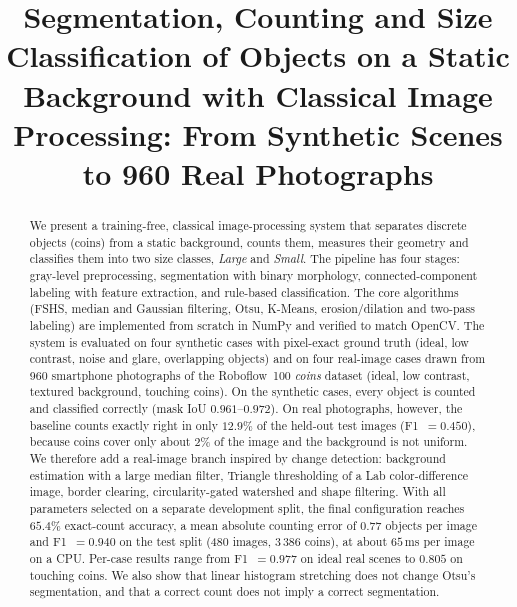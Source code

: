 \documentclass[conference,a4paper]{IEEEtran}
\newcommand{\vn}[1]{{\fontencoding{T5}\selectfont #1}}  %
\begin{document}
\title{Segmentation, Counting and Size Classification of Objects on a Static Background with Classical Image Processing: From Synthetic Scenes to 960 Real Photographs}

\author{
\IEEEauthorblockN{\vn{Ngô Quang Huy}}
\and
\IEEEauthorblockN{\vn{Nguyễn Đức Mạnh}}
\and
\IEEEauthorblockN{\vn{Hoàng Văn Anh}}
}

\maketitle

\begin{abstract}
We present a training-free, classical image-processing system that separates discrete objects (coins) from a static background, counts them, measures their geometry and classifies them into two size classes, \emph{Large} and \emph{Small}. The pipeline has four stages: gray-level preprocessing, segmentation with binary morphology, connected-component labeling with feature extraction, and rule-based classification. The core algorithms (FSHS, median and Gaussian filtering, Otsu, K-Means, erosion/dilation and two-pass labeling) are implemented from scratch in NumPy and verified to match OpenCV. The system is evaluated on four synthetic cases with pixel-exact ground truth (ideal, low contrast, noise and glare, overlapping objects) and on four real-image cases drawn from 960 smartphone photographs of the Roboflow~100 \emph{coins} dataset (ideal, low contrast, textured background, touching coins). On the synthetic cases, every object is counted and classified correctly (mask IoU $0.961$--$0.972$). On real photographs, however, the baseline counts exactly right in only $12.9\%$ of the held-out test images (F1~$=0.450$), because coins cover only about $2\%$ of the image and the background is not uniform. We therefore add a real-image branch inspired by change detection: background estimation with a large median filter, Triangle thresholding of a Lab color-difference image, border clearing, circularity-gated watershed and shape filtering. With all parameters selected on a separate development split, the final configuration reaches $65.4\%$ exact-count accuracy, a mean absolute counting error of $0.77$ objects per image and F1~$=0.940$ on the test split (480 images, 3\,386 coins), at about $65$\,ms per image on a CPU. Per-case results range from F1~$=0.977$ on ideal real scenes to $0.805$ on touching coins. We also show that linear histogram stretching does not change Otsu's segmentation, and that a correct count does not imply a correct segmentation.
\end{abstract}
\end{document}
